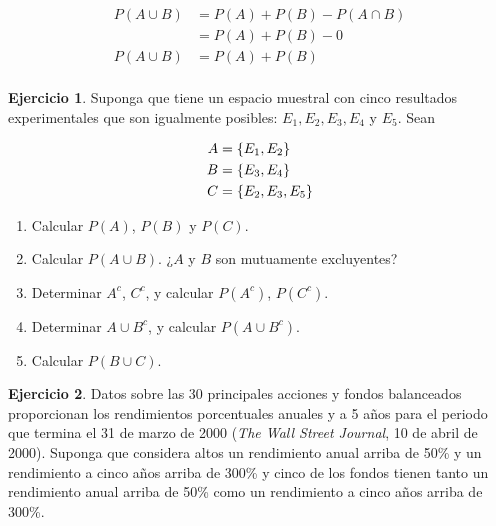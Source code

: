 \documentclass[
]{book}
\providecommand{\tightlist}{%
  \setlength{\itemsep}{0pt}\setlength{\parskip}{0pt}}
\theoremstyle{definition}
\theoremstyle{definition}
\theoremstyle{definition}
\newtheorem{exercise}{Ejercicio}[chapter]
\theoremstyle{definition}
\theoremstyle{remark}
\begin{document}
\begin{enumerate}
  \begin{equation}
  \begin{split}
  P(A\cup B) &= P(A) + P(B) - P(A\cap B)\\
  &= P(A) + P(B) - 0\\
  P(A\cup B) &= P(A) + P(B)\\
  \end{split}
  \label{eq:leyadicion2}
  \end{equation}

  \begin{exercise}

  Suponga que tiene un espacio muestral con cinco resultados experimentales que son igualmente posibles: \(E_1,E_2,E_3,E_4\) y \(E_5\). Sean

  \begin{equation}
  \notag
  \begin{split}
  A &= \lbrace E_1, E_2 \rbrace\\
  B &= \lbrace E_3, E_4 \rbrace\\
  C &= \lbrace E_2, E_3, E_5 \rbrace\\
  \end{split}
  \end{equation}

  \begin{enumerate}
  \def\labelenumii{\alph{enumii}.}
  \tightlist
  \item
    Calcular \(P(A)\), \(P(B)\) y \(P(C)\).
  \item
    Calcular \(P(A \cup B)\). ¿\(A\) y \(B\) son mutuamente excluyentes?
  \item
    Determinar \(A^c\), \(C^c\), y calcular \(P(A^c)\), \(P(C^c)\).
  \item
    Determinar \(A\cup B^c\), y calcular \(P(A\cup B^c)\).
  \item
    Calcular \(P(B\cup C)\).
  \end{enumerate}

  \end{exercise}

  \begin{exercise}

  Datos sobre las 30 principales acciones y fondos balanceados proporcionan los rendimientos porcentuales anuales y a 5 años para el periodo que termina el 31 de marzo de 2000 (\emph{The Wall Street Journal}, 10 de abril de 2000). Suponga que considera altos un rendimiento anual arriba de 50\% y un rendimiento a cinco años arriba de 300\% y cinco de los fondos tienen tanto un rendimiento anual arriba de 50\% como un rendimiento a cinco años arriba de 300\%.


\end{exercise}
\end{enumerate}
\end{document}
